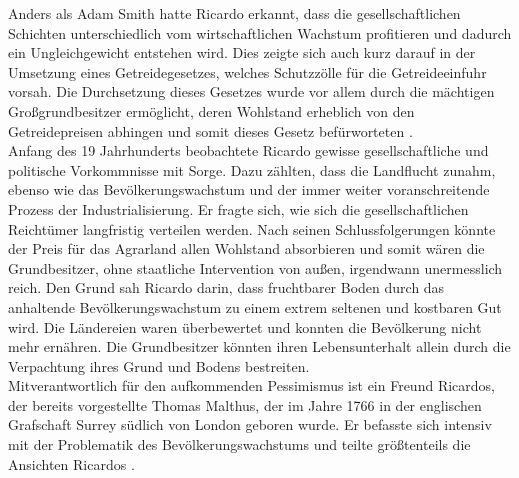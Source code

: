%
Anders als Adam Smith hatte Ricardo erkannt, dass die gesellschaftlichen Schichten unterschiedlich vom wirtschaftlichen Wachstum profitieren und dadurch ein Ungleichgewicht entstehen wird. Dies zeigte sich auch kurz darauf in der Umsetzung eines Getreidegesetzes, welches Schutzzölle für die Getreideeinfuhr vorsah. Die Durchsetzung dieses Gesetzes wurde vor allem durch die mächtigen Großgrundbesitzer ermöglicht, deren Wohlstand erheblich von den Getreidepreisen abhingen und somit dieses Gesetz befürworteten \cite[S. 134]{Kurz.2008}.\\
%
Anfang des 19 Jahrhunderts beobachtete Ricardo gewisse gesellschaftliche und politische Vorkommnisse mit Sorge. Dazu zählten, dass die Landflucht zunahm, ebenso wie das Bevölkerungswachstum und der immer weiter voranschreitende Prozess der Industrialisierung. Er fragte sich, wie sich die gesellschaftlichen Reichtümer langfristig verteilen werden. Nach seinen Schlussfolgerungen könnte der Preis für das Agrarland allen Wohlstand absorbieren und somit wären die Grundbesitzer, ohne staatliche Intervention von außen, irgendwann unermesslich reich. Den Grund sah Ricardo darin, dass fruchtbarer Boden durch das anhaltende Bevölkerungswachstum zu einem extrem seltenen und kostbaren Gut wird. Die Ländereien waren überbewertet und konnten die Bevölkerung nicht mehr ernähren. Die Grundbesitzer könnten ihren Lebensunterhalt allein durch die Verpachtung ihres Grund und Bodens bestreiten. \\
%
Mitverantwortlich für den aufkommenden Pessimismus ist ein Freund Ricardos, der bereits vorgestellte Thomas Malthus, der im Jahre 1766 in der englischen Grafschaft Surrey südlich von London geboren wurde. Er befasste sich intensiv mit der Problematik des Bevölkerungswachstums und teilte größtenteils die Ansichten Ricardos .\\

